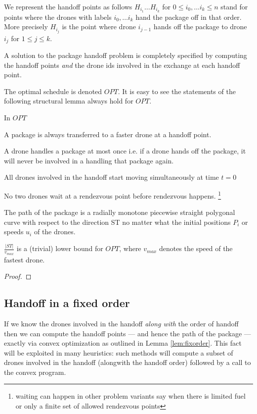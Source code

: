 \documentclass[10pt, english, oneside]{report}
\begin{document}
We represent the handoff points as follows $H_{i_1} \ldots H_{i_k}$ for $0 \leq i_0, \ldots i_k \leq n$ stand 
for points where the drones with labels $i_0, \ldots i_k$ hand the package off in that order. More precisely 
$H_{i_j}$ is the point where drone $i_{j-1}$ hands off the package to drone $i_j$ for $1 \leq j \leq k$.  

A solution to the package handoff problem is completely specified by computing the handoff points \textit{and} the 
drone ids involved in the exchange at each handoff point. 

The optimal schedule is denoted $OPT$. It is easy to see the statements of the following structural lemma always 
hold for $OPT$. 

\begin{flem}

In $OPT$
\begin{alphalist}
\item A package is always transferred to a faster drone at a handoff point. 
\item A drone handles a package at most once i.e. if a drone hands off the package, 
      it will never be involved in a handling that package again. 
\item All drones involved in the handoff start moving simultaneously at time $t=0$ 
\item No two drones wait at a rendezvous point before rendezvous happens. 
     \footnote{waiting can happen in other problem variants 
     say when there is limited fuel or only a finite set of 
     allowed rendezvous points}
\item The path of the package is a radially monotone piecewise straight polygonal curve with respect to the 
    direction ST no matter what the initial positions $P_i$ or speeds $u_i$ of the drones. 
\item $\frac{|ST|}{v_{max}}$ is a (trivial) lower bound for $OPT$, where $v_{max}$ denotes the speed of the fastest drone. 
\end{alphalist}
\end{flem}

\begin{proof}
\end{proof}

\newpage
\subsection{Handoff in a fixed order}
\label{ssec:fixorder}
If we know the drones involved in the handoff \textit{along with} the order of handoff 
then we can compute the handoff points --- and hence the path of the package --- exactly via 
convex optimization as outlined in Lemma \autoref{lem:fixorder}. This fact will be exploited in many 
heuristics: such methods will compute a subset of drones involved in the handoff (alongwith 
the handoff order) followed by a call to the convex program. 
\end{document}
